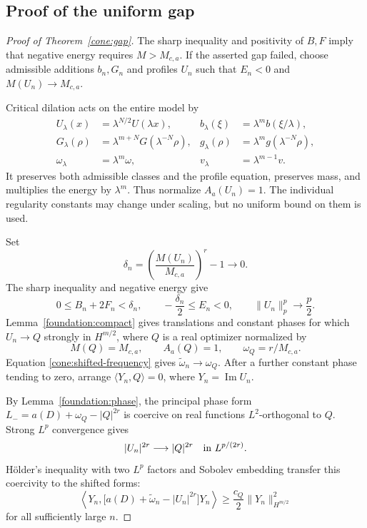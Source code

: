 \subsection{Proof of the uniform gap}

\begin{proof}[Proof of Theorem~\ref{cone:gap}]
The sharp inequality and positivity of \(B,F\) imply that
negative energy requires \(M>M_{c,a}\). If the asserted gap
failed, choose admissible additions \(b_n,G_n\) and profiles
\(U_n\) such that \(E_n<0\) and \(M(U_n)\to M_{c,a}\).

Critical dilation acts on the entire model by
\begin{align*}
U_\lambda(x)&=\lambda^{N/2}U(\lambda x),&
b_\lambda(\xi)&=\lambda^m b(\xi/\lambda),\\
G_\lambda(\rho)&=\lambda^{m+N}G(\lambda^{-N}\rho),&
g_\lambda(\rho)&=\lambda^m g(\lambda^{-N}\rho),\\
\omega_\lambda&=\lambda^m\omega,&
v_\lambda&=\lambda^{m-1}v.
\end{align*}
It preserves both admissible classes and the profile equation,
preserves mass, and multiplies the energy by \(\lambda^m\).
Thus normalize \(A_a(U_n)=1\). The individual regularity constants
may change under scaling, but no uniform bound on them is used.

Set
\[
\delta_n=\left(\frac{M(U_n)}{M_{c,a}}\right)^r-1\longrightarrow0.
\]
The sharp inequality and negative energy give
\begin{equation}\label{cone:near-threshold}
0\le B_n+2F_n<\delta_n,\qquad
-\frac{\delta_n}{2}\le E_n<0,\qquad
\|U_n\|_p^p\longrightarrow\frac p2.
\end{equation}
Lemma~\ref{foundation:compact} gives translations and constant
phases for which \(U_n\to Q\) strongly in \(H^{m/2}\), where
\(Q\) is a real optimizer normalized by
\[
M(Q)=M_{c,a},\qquad A_a(Q)=1,\qquad
\omega_Q=r/M_{c,a}.
\]
Equation \eqref{cone:shifted-frequency} gives
\(\widetilde\omega_n\to\omega_Q\).
After a further constant phase tending to zero, arrange
\(\langle Y_n,Q\rangle=0\), where \(Y_n=\operatorname{Im}U_n\).

By Lemma~\ref{foundation:phase}, the principal phase form
\(L_-=a(D)+\omega_Q-|Q|^{2r}\) is coercive on real functions
\(L^2\)-orthogonal to \(Q\). Strong \(L^p\) convergence gives
\[
|U_n|^{2r}\longrightarrow|Q|^{2r}
\quad\hbox{in }L^{p/(2r)}.
\]
H\"older's inequality with two \(L^p\) factors and Sobolev
embedding transfer this coercivity to the shifted forms:
\[
\left\langle Y_n,
\bigl[a(D)+\widetilde\omega_n-|U_n|^{2r}\bigr]Y_n\right\rangle
\ge\frac{c_Q}{2}\|Y_n\|_{H^{m/2}}^2
\]
for all sufficiently large \(n\).


\end{proof}
